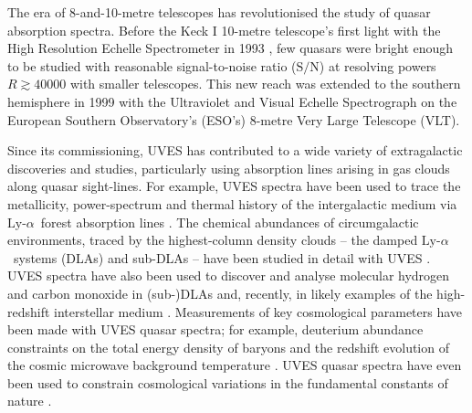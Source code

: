 \documentclass[fleqn,usenatbib,usedcolumn]{mnras}
\renewcommand{\la}{\lesssim} %
\renewcommand{\ga}{\gtrsim} %
\newcommand{\SN}{\ensuremath{\textrm{S/N}}}
\newcommand{\lya}{\ensuremath{\textrm{Ly-}\alpha}}
\begin{document}
The era of 8-and-10-metre telescopes has revolutionised the study of quasar absorption spectra. Before the Keck I 10-metre telescope's first light with the High Resolution Echelle Spectrometer in 1993 \citep[HIRES;][]{Vogt:1994:362}, few quasars were bright enough to be studied with reasonable signal-to-noise ratio (\SN) at resolving powers $R\ga40000$ with smaller telescopes. This new reach was extended to the southern hemisphere in 1999 with the Ultraviolet and Visual Echelle Spectrograph \citep[UVES;][]{Dekker:2000:534} on the European Southern Observatory's (ESO's) 8-metre Very Large Telescope (VLT).

Since its commissioning, UVES has contributed to a wide variety of extragalactic discoveries and studies, particularly using absorption lines arising in gas clouds along quasar sight-lines. For example, UVES spectra have been used to trace the metallicity, power-spectrum and thermal history of the intergalactic medium via \lya\ forest absorption lines \citep[e.g.][]{Schaye:2003:768,Kim:2004:355,Boera:2014:1916}. The chemical abundances of circumgalactic environments, traced by the highest-column density clouds -- the damped \lya\ systems (DLAs) and sub-DLAs -- have been studied in detail with UVES \citep[e.g][]{Molaro:2000:54,Pettini:2002:21,Pettini:2008:2011,Dessauges-Zavadsky:2003:447}. UVES spectra have also been used to discover and analyse molecular hydrogen and carbon monoxide in (sub-)DLAs \citep[e.g.][]{Ledoux:2003:209,Noterdaeme:2008:327,Srianand:2008:L39} and, recently, in likely examples of the high-redshift interstellar medium \citep[e.g.][]{Noterdaeme:2015:A24,Noterdaeme:2017:A82}. Measurements of key cosmological parameters have been made with UVES quasar spectra; for example, deuterium abundance constraints on the total energy density of baryons \citep[e.g.][]{Pettini:2008:1499,Pettini:2012:2477,Riemer-Sorensen:2017:3239} and the redshift evolution of the cosmic microwave background temperature \citep[e.g.][]{Noterdaeme:2011:L7}. UVES quasar spectra have even been used to constrain cosmological variations in the fundamental constants of nature \citep[e.g.][]{Quast:2004:L7,King:2008:251304,King:2012:3370,Rahmani:2013:861,Molaro:2013:A68,Murphy:2016:2461}.
\end{document}
